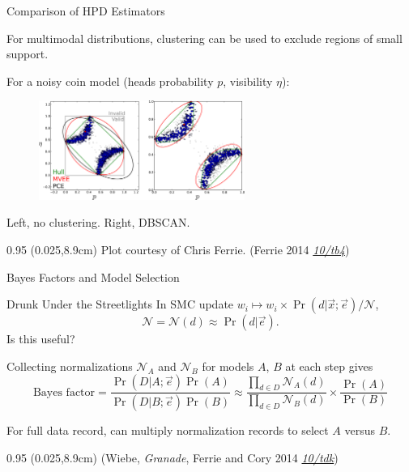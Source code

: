 \documentclass[xcolor=dvipsnames, compress]{beamer}
\renewcommand\UrlFont{\color{red}\rmfamily\itshape}
\newcommand{\shortdoi}[1]{\href{http://doi.org/#1}{\UrlFont 10/#1}}
\newcommand{\bottomnote}[1]{
  \begin{textblock*}{0.95\paperwidth} (0.025\paperwidth,8.9cm)
    {\tiny \hfill #1}
  \end{textblock*}
}
\begin{document}
\begin{frame}{Comparison of HPD Estimators}

  For multimodal distributions, clustering can be used
  to exclude regions of small support.

  For a noisy coin model (heads probability $p$, visibility $\eta$):

  \begin{figure}
    \includegraphics[width=0.6\textwidth]{figures/hpd-clusters}
  \end{figure}

  Left, no clustering. Right, DBSCAN.

  \bottomnote{Plot courtesy of Chris Ferrie. (Ferrie 2014 \shortdoi{tb4})}

\end{frame}

\begin{frame}{Bayes Factors and Model Selection}

  
  \begin{block}{Drunk Under the Streetlights}
    In SMC update $w_i \mapsto w_i \times \Pr(d | \vec{x}; \vec{e}) / \mathcal{N}$,
    $$
      \mathcal{N} = \mathcal{N}(d) \approx \Pr(d | \vec{e}).
    $$
    Is this useful?
  \end{block}

  \pause

  Collecting normalizations $\mathcal{N}_A$ and $\mathcal{N}_B$
  for models $A$, $B$ at each step gives
  $$
    \text{Bayes factor} = \frac{\Pr(D | A; \vec{e}) \Pr(A)}{\Pr(D | B; \vec{e}) \Pr(B)}
    \approx \frac{\prod_{d\in D}\mathcal{N}_A(d)}{\prod_{d\in D}\mathcal{N}_B(d)}
    \times \frac{\Pr(A)}{\Pr(B)} 
  $$

  For full data record, can multiply normalization records to select $A$ versus $B$.

  \bottomnote{(Wiebe, \emph{Granade}, Ferrie and Cory 2014 \shortdoi{tdk})}

\end{frame}
\end{document}
